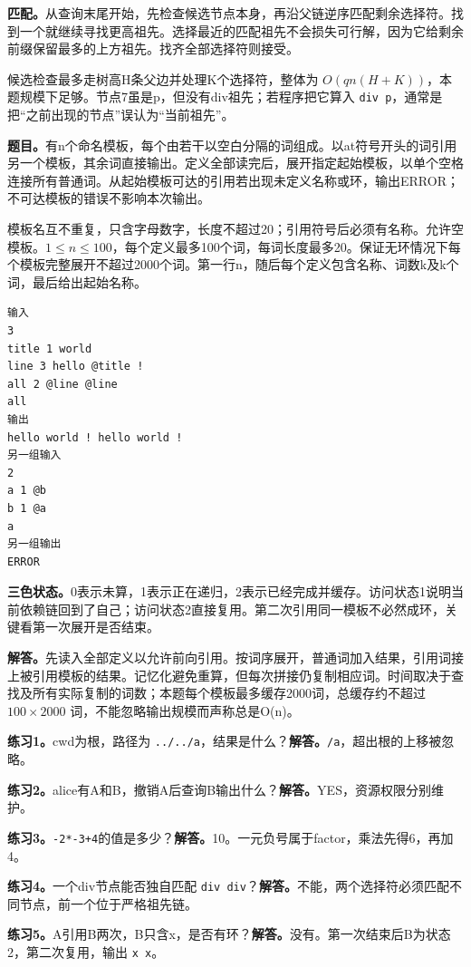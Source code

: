 \textbf{匹配。}从查询末尾开始，先检查候选节点本身，再沿父链逆序匹配剩余选择符。找到一个就继续寻找更高祖先。选择最近的匹配祖先不会损失可行解，因为它给剩余前缀保留最多的上方祖先。找齐全部选择符则接受。

候选检查最多走树高H条父边并处理K个选择符，整体为 $O(qn(H+K))$，本题规模下足够。节点7虽是p，但没有div祖先；若程序把它算入 \texttt{div p}，通常是把“之前出现的节点”误认为“当前祖先”。

\textbf{题目。}有n个命名模板，每个由若干以空白分隔的词组成。以at符号开头的词引用另一个模板，其余词直接输出。定义全部读完后，展开指定起始模板，以单个空格连接所有普通词。从起始模板可达的引用若出现未定义名称或环，输出ERROR；不可达模板的错误不影响本次输出。

模板名互不重复，只含字母数字，长度不超过20；引用符号后必须有名称。允许空模板。$1\le n\le100$，每个定义最多100个词，每词长度最多20。保证无环情况下每个模板完整展开不超过2000个词。第一行n，随后每个定义包含名称、词数k及k个词，最后给出起始名称。
\begin{verbatim}
输入
3
title 1 world
line 3 hello @title !
all 2 @line @line
all
输出
hello world ! hello world !
另一组输入
2
a 1 @b
b 1 @a
a
另一组输出
ERROR
\end{verbatim}
\textbf{三色状态。}0表示未算，1表示正在递归，2表示已经完成并缓存。访问状态1说明当前依赖链回到了自己；访问状态2直接复用。第二次引用同一模板不必然成环，关键看第一次展开是否结束。

\textbf{解答。}先读入全部定义以允许前向引用。按词序展开，普通词加入结果，引用词接上被引用模板的结果。记忆化避免重算，但每次拼接仍复制相应词。时间取决于查找及所有实际复制的词数；本题每个模板最多缓存2000词，总缓存约不超过 $100\times2000$ 词，不能忽略输出规模而声称总是O(n)。

\exercise
\textbf{练习1。}cwd为根，路径为 \texttt{../../a}，结果是什么？\textbf{解答。}\texttt{/a}，超出根的上移被忽略。

\textbf{练习2。}alice有A和B，撤销A后查询B输出什么？\textbf{解答。}YES，资源权限分别维护。

\textbf{练习3。}\texttt{-2*-3+4}的值是多少？\textbf{解答。}10。一元负号属于factor，乘法先得6，再加4。

\textbf{练习4。}一个div节点能否独自匹配 \texttt{div div}？\textbf{解答。}不能，两个选择符必须匹配不同节点，前一个位于严格祖先链。

\textbf{练习5。}A引用B两次，B只含x，是否有环？\textbf{解答。}没有。第一次结束后B为状态2，第二次复用，输出 \texttt{x x}。
\newpage
